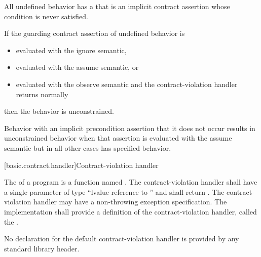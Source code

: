 \pnum
All undefined behavior has a
that is an implicit contract assertion
whose condition is never satisfied.

\pnum
\begin{note}
If the guarding contract assertion
of undefined behavior
is
\begin{itemize}
\item evaluated with the ignore semantic,
\item evaluated with the assume semantic, or
\item evaluated with the observe semantic
and the contract-violation handler returns normally
\end{itemize}
then the behavior is unconstrained.
\end{note}

\pnum
\begin{note}
Behavior with
an implicit precondition assertion that it does not occur
results in unconstrained behavior
when that assertion is evaluated with the
assume semantic
but in all other cases has specified behavior.
\end{note}


[basic.contract.handler]{Contract-violation handler}

\pnum
{}%
%
The 
of a program is a function named
.
The contract-violation handler
shall have a single parameter
of type
``lvalue reference to  ''
and shall return .
The contract-violation handler
may have a non-throwing exception specification.
The implementation
shall provide a definition of the contract-violation handler,
called the .
\begin{note}
No declaration
for the default contract-violation handler
is provided by
any standard library header.
\end{note}

